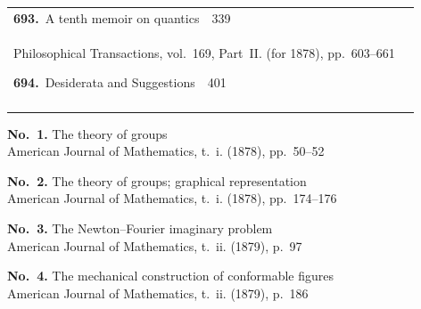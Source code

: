 \documentclass[11pt,a4paper]{book}
\newcommand{\paperentry}[4]{%
  \noindent\textbf{#1.}\ {#2}\ \dotfill\ {#3}\\[-0.2em]%
  {\small #4}\par\vspace{0.6em}%
}
\begin{document}
\begin{center}
\begin{tabular}{p{4.2in}r}
\paperentry{693}{A tenth memoir on quantics}{339}{Philosophical Transactions, vol.~169, Part~II. (for 1878), pp.~603--661}
\paperentry{694}{Desiderata and Suggestions}{401}{}
\end{tabular}
\end{center}

\vspace{0.5em}
\noindent\hspace{2em}\textbf{No.~1.} The theory of groups\\
{\small American Journal of Mathematics, t.~i. (1878), pp.~50--52}
\vspace{0.4em}

\noindent\hspace{2em}\textbf{No.~2.} The theory of groups; graphical representation\\
{\small American Journal of Mathematics, t.~i. (1878), pp.~174--176}
\vspace{0.4em}

\noindent\hspace{2em}\textbf{No.~3.} The Newton--Fourier imaginary problem\\
{\small American Journal of Mathematics, t.~ii. (1879), p.~97}
\vspace{0.4em}

\noindent\hspace{2em}\textbf{No.~4.} The mechanical construction of conformable figures\\
{\small American Journal of Mathematics, t.~ii. (1879), p.~186}
\vspace{0.6em}
\end{document}
